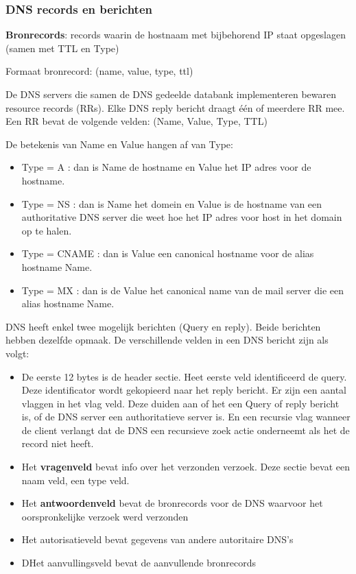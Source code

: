 \subsubsection{DNS records en berichten}

\noindent \textbf{Bronrecords}: records waarin de hostnaam met bijbehorend IP staat opgeslagen (samen met TTL en Type)

\noindent Formaat bronrecord: (name, value, type, ttl)

\noindent De DNS servers die samen de DNS gedeelde databank implementeren bewaren resource records (RRs). Elke DNS reply bericht draagt één of meerdere RR mee. Een RR bevat de volgende velden:
(Name, Value, Type, TTL)

De betekenis van Name en Value hangen af van Type:
\begin{itemize}
   \item Type = A : dan is Name de hostname en Value het IP adres voor de hostname.
 \item Type = NS : dan is Name het domein en Value is de hostname van een authoritative DNS server die weet hoe het IP adres voor host in het domain op te halen.
 \item Type = CNAME : dan is Value een canonical hostname voor de alias hostname Name.
 \item Type = MX : dan is de Value het canonical name van de mail server die een alias hostname Name.
\end{itemize}



DNS heeft enkel twee mogelijk berichten (Query en reply). Beide berichten hebben dezelfde opmaak. De verschillende velden in een DNS bericht zijn als volgt:
\begin{itemize}
   \item De eerste 12 bytes is de header sectie. Heet eerste veld identificeerd de query. Deze identificator wordt gekopieerd naar het reply bericht. Er zijn een aantal vlaggen in het vlag veld. Deze duiden aan of het een Query of reply bericht is, of de DNS server een authoritatieve server is. En een recursie vlag wanneer de client verlangt dat de DNS een recursieve zoek actie onderneemt als het de record niet heeft.
\item Het \textbf{vragenveld} bevat info over het verzonden verzoek. Deze sectie bevat een naam veld, een type veld.
\item Het \textbf{antwoordenveld} bevat de bronrecords voor de DNS waarvoor het oorspronkelijke verzoek werd verzonden
\item Het autorisatieveld bevat gegevens van andere autoritaire DNS’s
\item DHet aanvullingsveld bevat de aanvullende bronrecords
\end{itemize}


